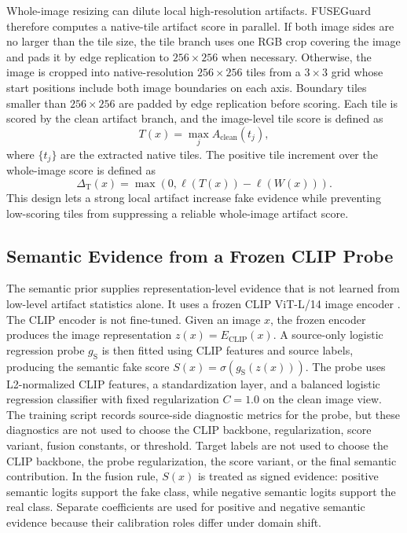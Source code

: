 \documentclass[letterpaper,journal]{IEEEtran}
\begin{document}
Whole-image resizing can dilute local high-resolution artifacts. FUSEGuard therefore computes a native-tile artifact score in parallel. If both image sides are no larger than the tile size, the tile branch uses one RGB crop covering the image and pads it by edge replication to $256 \times 256$ when necessary. Otherwise, the image is cropped into native-resolution $256 \times 256$ tiles from a $3 \times 3$ grid whose start positions include both image boundaries on each axis. Boundary tiles smaller than $256 \times 256$ are padded by edge replication before scoring. Each tile is scored by the clean artifact branch, and the image-level tile score is defined as
\[
    T(x)=\max_{j} A_{\mathrm{clean}}(t_j),
\]
where $\{t_j\}$ are the extracted native tiles. The positive tile increment over the whole-image score is defined as
\[
    \Delta_{\mathrm{T}}(x)=\max\left(0,\ell(T(x))-\ell(W(x))\right).
\]
This design lets a strong local artifact increase fake evidence while preventing low-scoring tiles from suppressing a reliable whole-image artifact score.

\subsection{Semantic Evidence from a Frozen CLIP Probe}
\label{sec:method_semantic}

The semantic prior supplies representation-level evidence that is not learned from low-level artifact statistics alone. It uses a frozen CLIP ViT-L/14 image encoder \cite{radford2021clip}. The CLIP encoder is not fine-tuned. Given an image $x$, the frozen encoder produces the image representation $z(x)=E_{\mathrm{CLIP}}(x)$. A source-only logistic regression probe $g_{\mathrm{S}}$ is then fitted using CLIP features and source labels, producing the semantic fake score $S(x)=\sigma(g_{\mathrm{S}}(z(x)))$. The probe uses L2-normalized CLIP features, a standardization layer, and a balanced logistic regression classifier with fixed regularization $C=1.0$ on the clean image view. The training script records source-side diagnostic metrics for the probe, but these diagnostics are not used to choose the CLIP backbone, regularization, score variant, fusion constants, or threshold. Target labels are not used to choose the CLIP backbone, the probe regularization, the score variant, or the final semantic contribution. In the fusion rule, $S(x)$ is treated as signed evidence: positive semantic logits support the fake class, while negative semantic logits support the real class. Separate coefficients are used for positive and negative semantic evidence because their calibration roles differ under domain shift.
\end{document}
